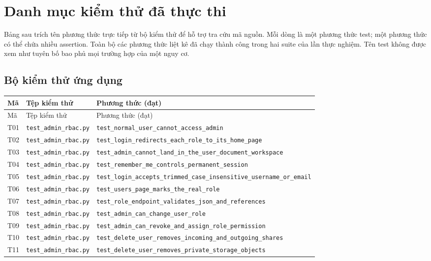 \chapter{Danh mục kiểm thử đã thực thi}
Bảng sau trích tên phương thức trực tiếp từ bộ kiểm thử để hỗ trợ tra cứu mã nguồn. Mỗi dòng là một phương thức test; một phương thức có thể chứa nhiều assertion. Toàn bộ các phương thức liệt kê đã chạy thành công trong hai suite của lần thực nghiệm. Tên test không được xem như tuyên bố bao phủ mọi trường hợp của một nguy cơ.
\section{Bộ kiểm thử ứng dụng}
{\footnotesize
\begin{longtable}{P{.8cm}P{4cm}P{8cm}}
\toprule Mã & Tệp kiểm thử & Phương thức (đạt)\\\midrule\endfirsthead
\toprule Mã & Tệp kiểm thử & Phương thức (đạt)\\\midrule\endhead
T01 & \nolinkurl{test_admin_rbac.py} & \nolinkurl{test_normal_user_cannot_access_admin} \\
T02 & \nolinkurl{test_admin_rbac.py} & \nolinkurl{test_login_redirects_each_role_to_its_home_page} \\
T03 & \nolinkurl{test_admin_rbac.py} & \nolinkurl{test_admin_cannot_land_in_the_user_document_workspace} \\
T04 & \nolinkurl{test_admin_rbac.py} & \nolinkurl{test_remember_me_controls_permanent_session} \\
T05 & \nolinkurl{test_admin_rbac.py} & \nolinkurl{test_login_accepts_trimmed_case_insensitive_username_or_email} \\
T06 & \nolinkurl{test_admin_rbac.py} & \nolinkurl{test_users_page_marks_the_real_role} \\
T07 & \nolinkurl{test_admin_rbac.py} & \nolinkurl{test_role_endpoint_validates_json_and_references} \\
T08 & \nolinkurl{test_admin_rbac.py} & \nolinkurl{test_admin_can_change_user_role} \\
T09 & \nolinkurl{test_admin_rbac.py} & \nolinkurl{test_admin_can_revoke_and_assign_role_permission} \\
T10 & \nolinkurl{test_admin_rbac.py} & \nolinkurl{test_delete_user_removes_incoming_and_outgoing_shares} \\
T11 & \nolinkurl{test_admin_rbac.py} & \nolinkurl{test_delete_user_removes_private_storage_objects} \\

\end{longtable}}
